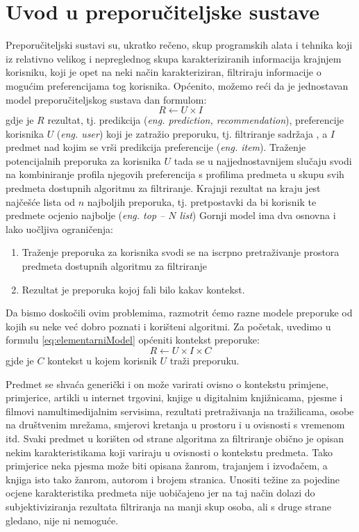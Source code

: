 \documentclass[times, utf8, diplomski, numeric]{fer}
\begin{document}
\section{Uvod u preporučiteljske sustave}
Preporučiteljski sustavi su, ukratko rečeno, skup programskih alata i tehnika
koji iz relativno velikog i nepreglednog skupa karakteriziranih informacija
krajnjem korisniku, koji je opet na neki način karakteriziran, filtriraju
informacije o mogućim preferencijama tog korisnika. Općenito, možemo reći da je
jednostavan model preporučiteljskog sustava dan formulom:
\begin{equation}
\label{eq:elementarniModel}
	R \leftarrow U \times I
\end{equation}
gdje je $R$ rezultat, tj. predikcija (\emph{eng. prediction, recommendation}),
preferencije korisnika $U$ (\emph{eng. user}) koji je zatražio preporuku, tj.
filtriranje sadržaja , a $I$ predmet nad kojim se vrši predikcija preferencije
(\emph{eng. item}). Traženje potencijalnih preporuka za korisnika $U$ tada se u
najjednostavnijem slučaju svodi na kombiniranje profila njegovih preferencija s
profilima predmeta u skupu svih predmeta dostupnih algoritmu za filtriranje.
Krajnji rezultat na kraju jest najčešće lista od $n$ najboljih preporuka, tj.
pretpostavki da bi korisnik te predmete ocjenio najbolje (\emph{eng. top -- $N$
list})
Gornji model ima dva osnovna i lako uočljiva ograničenja:
\begin{enumerate}
  \item Traženje preporuka za korisnika svodi se na iscrpno pretraživanje
  prostora predmeta dostupnih algoritmu za filtriranje
  \item Rezultat je preporuka kojoj fali bilo kakav kontekst.
\end{enumerate}

Da bismo doskočili ovim problemima, razmotrit ćemo razne modele preporuke od
kojih su neke već dobro poznati i korišteni algoritmi. Za početak, uvedimo u
formulu \ref{eq:elementarniModel} općeniti kontekst preporuke:
\begin{equation}
\label{eq:elementarniModelSKontekstom}
	R \leftarrow U \times I \times C
\end{equation}
gjde je $C$ kontekst u kojem korisnik $U$ traži preporuku.

Predmet se shvaća generički i on može varirati ovisno o kontekstu primjene,
primjerice, artikli u internet trgovini, knjige u digitalnim knjižnicama, pjesme
i filmovi namultimedijalnim servisima, rezultati pretraživanja na tražilicama,
osobe na društvenim mrežama, smjerovi kretanja u prostoru i u ovisnosti s
vremenom itd. Svaki predmet u korišten od strane algoritma za filtriranje obično
je opisan nekim karakteristikama koji variraju u ovisnosti o kontekstu predmeta.
Tako primjerice neka pjesma može biti opisana žanrom, trajanjem i izvođačem, a
knjiga isto tako žanrom, autorom i brojem stranica. Unositi težine za pojedine
ocjene karakteristika predmeta nije uobičajeno jer na taj način dolazi do
subjektiviziranja rezultata filtriranja na manji skup osoba, ali s druge strane
gledano, nije ni nemoguće.
\end{document}

